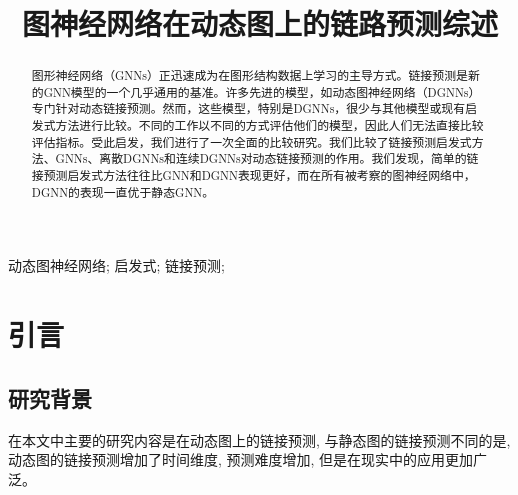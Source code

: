 \documentclass[conference]{IEEEtran}
\begin{document}
% 

\title{图神经网络在动态图上的链路预测综述}

\author{
}

\maketitle

\thispagestyle{fancy} %
\lhead{} %
\chead{} %
\rhead{} %
\lfoot{} %
\cfoot{\thepage} %
\rfoot{} %
\renewcommand{\headrulewidth}{0pt} %
\renewcommand{\footrulewidth}{0pt} %

\pagestyle{fancy}
\cfoot{\thepage}


\begin{abstract}
图形神经网络（GNNs）正迅速成为在图形结构数据上学习的主导方式。链接预测是新的GNN模型的一个几乎通用的基准。许多先进的模型，如动态图神经网络（DGNNs）专门针对动态链接预测。然而，这些模型，特别是DGNNs，很少与其他模型或现有启发式方法进行比较。不同的工作以不同的方式评估他们的模型，因此人们无法直接比较评估指标。受此启发，我们进行了一次全面的比较研究。我们比较了链接预测启发式方法、GNNs、离散DGNNs和连续DGNNs对动态链接预测的作用。我们发现，简单的链接预测启发式方法往往比GNN和DGNN表现更好，而在所有被考察的图神经网络中，DGNN的表现一直优于静态GNN。
\end{abstract}

\begin{IEEEkeywords}
动态图神经网络; 启发式; 链接预测;
\end{IEEEkeywords}

\section{引言}
\subsection{研究背景}
在本文中主要的研究内容是在动态图上的链接预测, 与静态图的链接预测不同的是, 动态图的链接预测增加了时间维度, 预测难度增加, 但是在现实中的应用更加广泛。
\end{document}
